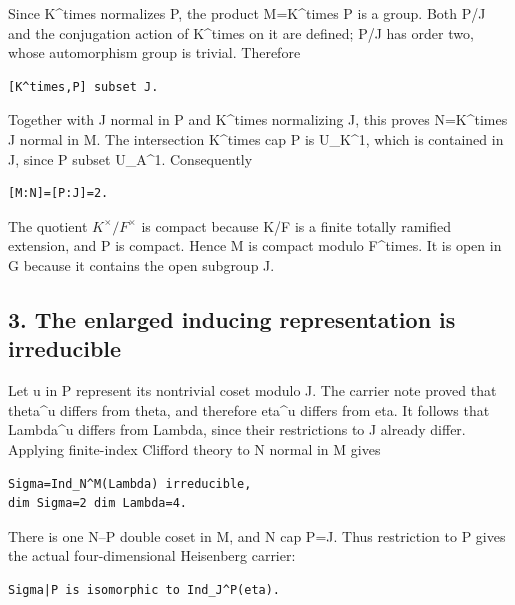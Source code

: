 Since K\^{}times normalizes P, the product M=K\^{}times P is a group.
Both P/J and the conjugation action of K\^{}times on it are defined; P/J
has order two, whose automorphism group is trivial. Therefore

\begin{Verbatim}[fontsize=\small,breaklines=true,breakanywhere=true]
[K^times,P] subset J.
\end{Verbatim}

Together with J normal in P and K\^{}times normalizing J, this proves
N=K\^{}times J normal in M. The intersection K\^{}times cap P is
U\_K\^{}1, which is contained in J, since P subset U\_A\^{}1.
Consequently

\begin{Verbatim}[fontsize=\small,breaklines=true,breakanywhere=true]
[M:N]=[P:J]=2.
\end{Verbatim}

The quotient \(K^\times/F^\times\) is compact because K/F is a
finite totally ramified extension, and P is compact. Hence M is compact
modulo F\^{}times. It is open in G because it contains the open subgroup
J.

\hypertarget{rank4_stages-the-enlarged-inducing-representation-is-irreducible}{%
\subsection{3. The enlarged inducing representation is
irreducible}\label{rank4_stages-the-enlarged-inducing-representation-is-irreducible}}

Let u in P represent its nontrivial coset modulo J. The carrier note
proved that theta\^{}u differs from theta, and therefore eta\^{}u
differs from eta. It follows that Lambda\^{}u differs from Lambda, since
their restrictions to J already differ. Applying finite-index Clifford
theory to N normal in M gives

\begin{Verbatim}[fontsize=\small,breaklines=true,breakanywhere=true]
Sigma=Ind_N^M(Lambda) irreducible,
dim Sigma=2 dim Lambda=4.
\end{Verbatim}

There is one N--P double coset in M, and N cap P=J. Thus restriction to
P gives the actual four-dimensional Heisenberg carrier:

\begin{Verbatim}[fontsize=\small,breaklines=true,breakanywhere=true]
Sigma|P is isomorphic to Ind_J^P(eta).
\end{Verbatim}

